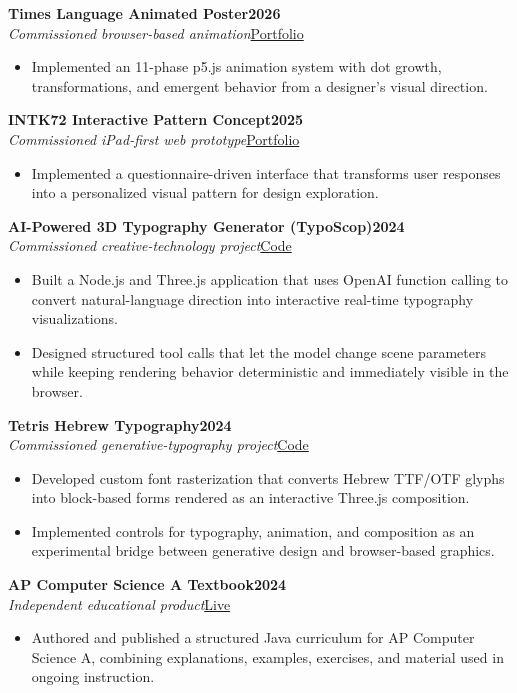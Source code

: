 \documentclass[10pt,letterpaper]{article}
\newenvironment{bullets}{\begin{itemize}[topsep=0.03cm,parsep=0pt,partopsep=0pt,itemsep=0.02cm,leftmargin=11pt]}{\end{itemize}}
\newcommand{\project}[4]{\needspace{6\baselineskip}\textbf{#1}\hfill\textbf{#2}\\[-1pt]\textit{#3}\hfill #4\par}
\begin{document}
\project{Times Language Animated Poster}{2026}{Commissioned browser-based animation}{\href{https://isadeh.com}{Portfolio}}
\begin{bullets}
\item Implemented an 11-phase p5.js animation system with dot growth, transformations, and emergent behavior from a designer's visual direction.
\end{bullets}

\project{INTK72 Interactive Pattern Concept}{2025}{Commissioned iPad-first web prototype}{\href{https://isadeh.com}{Portfolio}}
\begin{bullets}
\item Implemented a questionnaire-driven interface that transforms user responses into a personalized visual pattern for design exploration.
\end{bullets}

\project{AI-Powered 3D Typography Generator (TypoScop)}{2024}{Commissioned creative-technology project}{\href{https://github.com/IddoSadeh/TypoScop}{Code}}
\begin{bullets}
\item Built a Node.js and Three.js application that uses OpenAI function calling to convert natural-language direction into interactive real-time typography visualizations.
\item Designed structured tool calls that let the model change scene parameters while keeping rendering behavior deterministic and immediately visible in the browser.
\end{bullets}

\project{Tetris Hebrew Typography}{2024}{Commissioned generative-typography project}{\href{https://github.com/IddoSadeh/alephBetTetris}{Code}}
\begin{bullets}
\item Developed custom font rasterization that converts Hebrew TTF/OTF glyphs into block-based forms rendered as an interactive Three.js composition.
\item Implemented controls for typography, animation, and composition as an experimental bridge between generative design and browser-based graphics.
\end{bullets}

\project{AP Computer Science A Textbook}{2024}{Independent educational product}{\href{https://isadeh.com/AP-CSA/}{Live}}
\begin{bullets}
\item Authored and published a structured Java curriculum for AP Computer Science A, combining explanations, examples, exercises, and material used in ongoing instruction.
\end{bullets}
\end{document}
